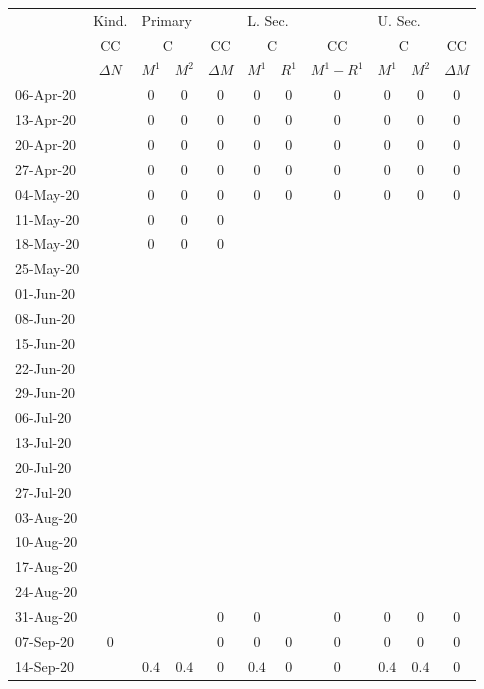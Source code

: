 \documentclass[fleqn,10pt]{wlscirep}
\begin{document}
\begin{table}
\begin{center}
{\tiny
								\begin{tabular}{l|c|cc|c|cc|c|cc|c}												
& \multicolumn{1}{l}{Kind.} & \multicolumn{3}{l}{Primary} & \multicolumn{3}{l}{L. Sec.} & \multicolumn{3}{l}{U. Sec.} \\												
& CC & \multicolumn{2}{c}{C} & CC & \multicolumn{2}{c}{C} & CC & \multicolumn{2}{c}{C} & CC \\												
	&$\Delta N$		&$M^1$	&$M^2$	&$\Delta M$	&$M^1$	&$R^1$	&$M^1-R^1$	&$M^1$	&$M^2$	&$\Delta M$	\\
06-Apr-20	&		&$0$	&$0$	&$0$	&$0$	&$0$	&$0$	&$0$	&$0$	&$0$	\\
13-Apr-20	&		&$0$	&$0$	&$0$	&$0$	&$0$	&$0$	&$0$	&$0$	&$0$	\\
20-Apr-20	&		&$0$	&$0$	&$0$	&$0$	&$0$	&$0$	&$0$	&$0$	&$0$	\\
27-Apr-20	&		&$0$	&$0$	&$0$	&$0$	&$0$	&$0$	&$0$	&$0$	&$0$	\\
04-May-20	&		&$0$	&$0$	&$0$	&$0$	&$0$	&$0$	&$0$	&$0$	&$0$	\\
11-May-20	&		&$0$	&$0$	&$0$	&	&	&	&	&	&	\\
18-May-20	&		&$0$	&$0$	&$0$	&	&	&	&	&	&	\\
25-May-20	&		&	&	&	&	&	&	&	&	&	\\
01-Jun-20	&		&	&	&	&	&	&	&	&	&	\\
08-Jun-20	&		&	&	&	&	&	&	&	&	&	\\
15-Jun-20	&		&	&	&	&	&	&	&	&	&	\\
22-Jun-20	&		&	&	&	&	&	&	&	&	&	\\
29-Jun-20	&		&	&	&	&	&	&	&	&	&	\\
06-Jul-20	&		&	&	&	&	&	&	&	&	&	\\
13-Jul-20	&		&	&	&	&	&	&	&	&	&	\\
20-Jul-20	&		&	&	&	&	&	&	&	&	&	\\
27-Jul-20	&		&	&	&	&	&	&	&	&	&	\\
03-Aug-20	&		&	&	&	&	&	&	&	&	&	\\
10-Aug-20	&		&	&	&	&	&	&	&	&	&	\\
17-Aug-20	&		&	&	&	&	&	&	&	&	&	\\
24-Aug-20	&		&	&	&	&	&	&	&	&	&	\\
31-Aug-20	&		&	&	&$0$	&$0$	&	&$0$	&$0$	&$0$	&$0$	\\
07-Sep-20	&$0$		&	&	&$0$	&$0$	&$0$	&$0$	&$0$	&$0$	&$0$	\\
14-Sep-20	&		&$0.4$	&$0.4$	&$0$	&$0.4$	&$0$	&$0$	&$0.4$	&$0.4$	&$0$	\\

\end{tabular}}
\end{center}
\end{table}
\end{document}
